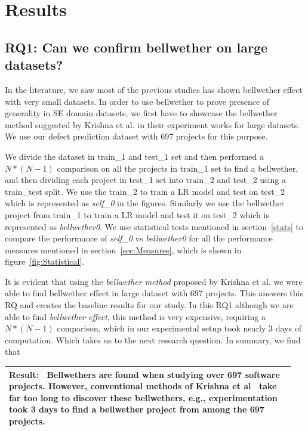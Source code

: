 \documentclass[10pt,journal,compsoc]{IEEEtran}
\newenvironment{result}
{\vspace{0.15cm}
\noindent\begin{minipage}{\linewidth}
\begin{center}
\arrayrulecolor{lightergray}
\begin{tabular}{|p{0.95\linewidth}|}
\hline%
\rowcolor{lightergray}%
\textbf{Result:}~%
}
{\\\hline
\end{tabular}
\end{center}
\end{minipage}
\vspace{0.15cm}
}
\begin{document}
\section{Results}
\label{sec:results}



\subsection*{RQ1: Can we confirm bellwether on large datasets?}
\label{sec:rq1}

In the literature, we saw most of the previous studies has shown bellwether effect with very small datasets. In order to use bellwether to prove presence of generality in SE domain datasets, we first have to showcase the bellwether method suggested by Krishna et al. in their experiment works for large datasets. We use our defect prediction dataset with 697 projects for this purpose. 

We divide the dataset in train\_1 and test\_1 set and then performed a $ N*(N-1) $ comparison on all the projects in train\_1 set to find a bellwether, and then dividing each project in test\_1 set into train\_2 and test\_2 using a train\_test split. We use the train\_2 to train a LR model and test on test\_2 which is represented as \textit{self\_0} in the figures. Similarly we use the bellwether project from train\_1 to train a LR model and test it on test\_2 which is represented as \textit{bellwether0}. We use statistical tests mentioned in section~\ref{stats} to compare the performance of \textit{self\_0} vs \textit{bellwether0} for all the performance measures mentioned in section~\ref{sec:Measures}, which is shown in figure~\ref{fig:Statistical}. 

It is evident that using the \textit{bellwether method} proposed by Krishna et al. we were able to find bellwether effect in large dataset with 697 projects. This answers this RQ and creates the baseline results for our study. In this RQ1 although we are able to find \textit{bellwether effect}, this method is very expensive, requiring a $ N*(N-1) $ comparison, which in our experimental setup took nearly 3 days of computation. Which takes us to the next research question. In summary, we find that 

\begin{result} {Bellwethers are found when studying over 697 software projects. However, conventional methods of Krishna et al~\cite{krishna2017learning} take far too long to discover these bellwethers, e.g., experimentation took 3 days to find a bellwether project from among the 697 projects.}
\end{result}
\end{document}
